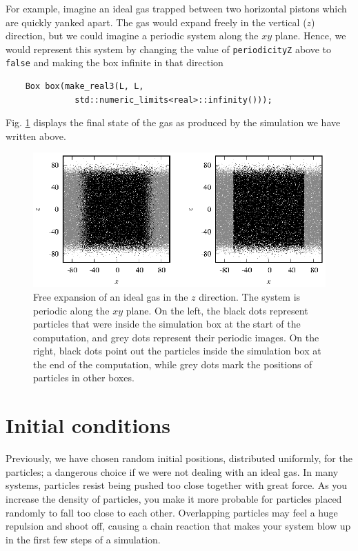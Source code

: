 For example, imagine an ideal gas trapped between two horizontal pistons which
are quickly yanked apart. The gas would expand freely in the vertical ($z$)
direction, but we could imagine a periodic system along the $xy$ plane. Hence,
we would represent this system by changing the value of \texttt{periodicityZ}
above to \texttt{false} and making the box infinite in that direction
\begin{lstlisting}
    Box box(make_real3(L, L,
              std::numeric_limits<real>::infinity()));
\end{lstlisting}
Fig. \ref{freeExpansion} displays the final state of
the gas as produced by the simulation we have written above.

\begin{figure}
  \includegraphics[width = \textwidth]{figures/freeExpansion.eps}
  \caption{\label{freeExpansion}Free expansion of an ideal gas in the $z$
           direction. The system is periodic along the $xy$ plane. On the left,
           the black dots represent particles that were inside the simulation
           box at the start of the computation, and grey dots represent their
           periodic images. On the right, black dots point out the particles
           inside the simulation box at the end of the computation, while grey
           dots mark the positions of particles in other boxes.}
\end{figure}

\section{Initial conditions}

Previously, we have chosen random initial positions, distributed uniformly, for 
the particles; a dangerous choice if we were not dealing with an ideal gas. In 
many systems, particles resist being pushed too close together with great force. 
As you increase the density of particles, you make it more probable for 
particles placed randomly to fall too close to each other. Overlapping particles 
may feel a huge repulsion and shoot off, causing a chain reaction that makes 
your system blow up in the first few steps of a simulation.

